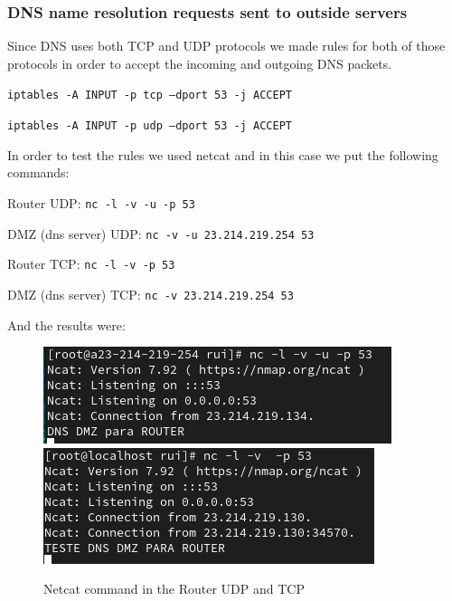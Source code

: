\documentclass{article}
\begin{document}
\subsubsection{DNS name resolution requests sent to outside servers}
\quad Since DNS uses both TCP and UDP protocols we made rules for both of those protocols in order to accept the incoming and outgoing DNS packets.\par
\texttt{}\par
\texttt{iptables -A INPUT -p tcp --dport 53 -j ACCEPT}\par
\texttt{iptables -A INPUT -p udp --dport 53 -j ACCEPT}\par
\texttt{}\par
In order to test the rules we used netcat and in this case we put the following commands:\par
\texttt{}\par
Router UDP: \texttt{nc -l -v -u -p 53} \par
DMZ (dns server) UDP: \texttt{nc -v -u 23.214.219.254 53} \par
\texttt{}\par
\texttt{}\par
Router TCP: \texttt{nc -l -v -p 53} \par
DMZ (dns server) TCP: \texttt{nc -v 23.214.219.254 53} \par
\texttt{}\par
And the results were:
\begin{figure}[H]
    \centering
    \includegraphics[scale=0.5]{in/in_dns_router.png}
    \includegraphics[scale=0.5]{in/in_dns_router_tcp.png}
    \caption{Netcat command in the Router UDP and TCP}
    \label{fig:network-arc}
\end{figure}
\end{document}
